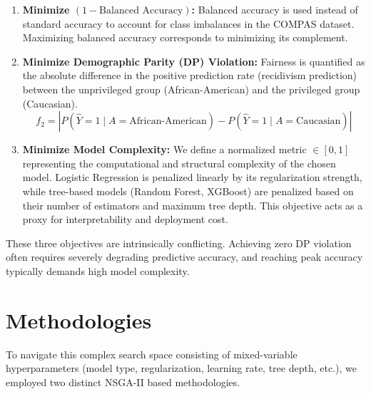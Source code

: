 \documentclass[12pt, a4paper]{article}
\begin{document}
\begin{enumerate}
    \item \textbf{Minimize $(1 - \text{Balanced Accuracy})$:} 
    Balanced accuracy is used instead of standard accuracy to account for class imbalances in the COMPAS dataset. Maximizing balanced accuracy corresponds to minimizing its complement.
    
    \item \textbf{Minimize Demographic Parity (DP) Violation:} 
    Fairness is quantified as the absolute difference in the positive prediction rate (recidivism prediction) between the unprivileged group (African-American) and the privileged group (Caucasian).
    \[
    f_2 = |P(\hat{Y}=1 \mid A=\text{African-American}) - P(\hat{Y}=1 \mid A=\text{Caucasian})|
    \]
    
    \item \textbf{Minimize Model Complexity:} 
    We define a normalized metric $\in [0, 1]$ representing the computational and structural complexity of the chosen model. Logistic Regression is penalized linearly by its regularization strength, while tree-based models (Random Forest, XGBoost) are penalized based on their number of estimators and maximum tree depth. This objective acts as a proxy for interpretability and deployment cost.
\end{enumerate}

These three objectives are intrinsically conflicting. Achieving zero DP violation often requires severely degrading predictive accuracy, and reaching peak accuracy typically demands high model complexity.

\section{Methodologies}
To navigate this complex search space consisting of mixed-variable hyperparameters (model type, regularization, learning rate, tree depth, etc.), we employed two distinct NSGA-II based methodologies.
\end{document}
